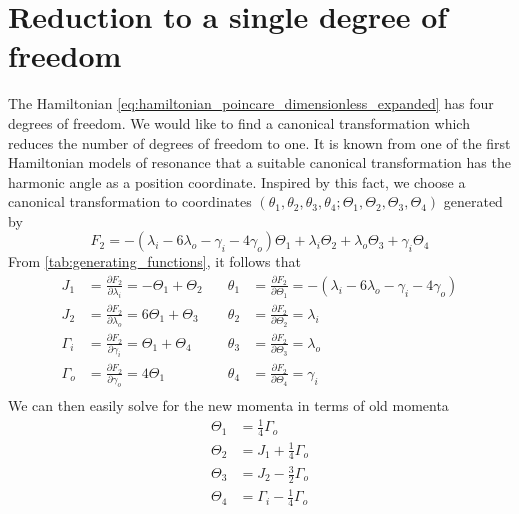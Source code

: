 \documentclass[twoside,openright,titlepage,numbers=noenddot,headinclude,%
                footinclude=true,cleardoublepage=empty,abstractoff, 
                BCOR=5mm,paper=a4,fontsize=11pt,%
                american,%
                ]{scrreprt}%
\begin{document}
\section{Reduction to a single degree of freedom}
\label{sec:Reduction_to_a_sdof}
The Hamiltonian \ref{eq:hamiltonian_poincare_dimensionless_expanded} has four
degrees of freedom. We would like to find a canonical transformation which
reduces the number of degrees of freedom to one. It is known from one of the 
first Hamiltonian models of resonance \citep{Henrard1983} that a suitable 
canonical transformation has the harmonic angle as a position coordinate.
Inspired by this fact, we choose a canonical transformation to coordinates
$(\theta_1,\theta_2,\theta_3,\theta_4;\Theta_1,\Theta_2,\Theta_3,\Theta_4)$ 
generated by
\begin{equation}
    F_2= -(\lambda_i-6\lambda_o -\gamma_i - 4\gamma_o)\Theta_1 + 
    \lambda_i\Theta_2+ \lambda_o\Theta_3+\gamma_i\Theta_4
\end{equation}
From \cref{tab:generating_functions}, it follows that 
\begin{equation}
    \begin{aligned}
        J_1&= \frac{\partial F_2}{\partial \lambda_i}=-\Theta_1+\Theta_2 & 
        \quad\theta_1&= \frac{\partial F_2}{\partial\Theta_1}=
        - (\lambda_i-6\lambda_o -\gamma_i - 4\gamma_o)\\
J_2&= \frac{\partial F_2}{\partial \lambda_o}=6\Theta_1+\Theta_3 & 
        \quad\theta_2&= \frac{\partial F_2}{\partial\Theta_2}=\lambda_i\\
\Gamma_i&= \frac{\partial F_2}{\partial \gamma_i}=\Theta_1+\Theta_4& 
        \quad\theta_3&= \frac{\partial F_2}{\partial\Theta_3}=\lambda_o\\
\Gamma_o&= \frac{\partial F_2}{\partial \gamma_o}=4\Theta_1& 
        \quad\theta_4&= \frac{\partial F_2}{\partial\Theta_4}=\gamma_i\\
    \end{aligned}
    \label{eq:new_momenta}
\end{equation}
We can then easily solve for the new momenta in terms of old momenta
\begin{equation}
    \begin{aligned}
        \Theta_1&= \frac{1}{4} \Gamma_o\\
        \Theta_2&=J_1+ \frac{1}{4} \Gamma_o\\
        \Theta_3&=J_2 - \frac{3}{2} \Gamma_o\\
        \Theta_4&= \Gamma_i - \frac{1}{4} \Gamma_o
    \end{aligned}
\end{equation}
\end{document}
